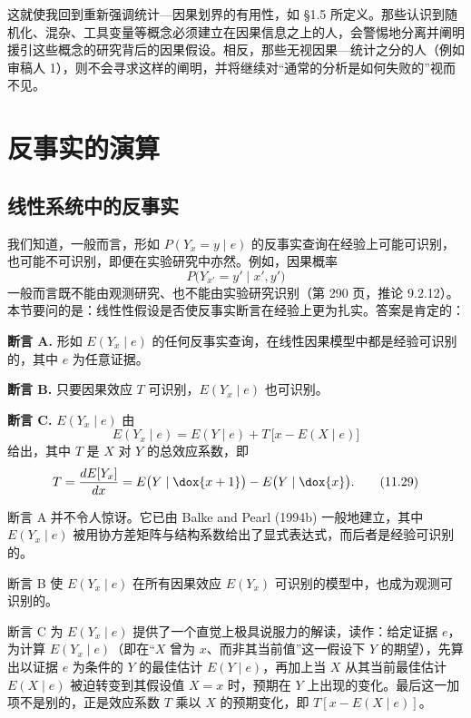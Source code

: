 这就使我回到重新强调统计—因果划界的有用性，如 \S1.5 所定义。那些认识到随机化、混杂、工具变量等概念必须建立在因果信息之上的人，会警惕地分离并阐明援引这些概念的研究背后的因果假设。相反，那些无视因果—统计之分的人（例如审稿人 1），则不会寻求这样的阐明，并将继续对“通常的分析是如何失败的”视而不见。

\section{反事实的演算}

\subsection{线性系统中的反事实}

我们知道，一般而言，形如 $P(Y_x=y\mid e)$ 的反事实查询在经验上可能可识别，也可能不可识别，即便在实验研究中亦然。例如，因果概率
\[
P\bigl(Y_{x'}=y'\mid x',y'\bigr)
\]
一般而言既不能由观测研究、也不能由实验研究识别（第 290 页，推论 9.2.12）。本节要问的是：线性性假设是否使反事实断言在经验上更为扎实。答案是肯定的：

\noindent\textbf{断言 A.} 形如 $E(Y_x\mid e)$ 的任何反事实查询，在线性因果模型中都是经验可识别的，其中 $e$ 为任意证据。

\noindent\textbf{断言 B.} 只要因果效应 $T$ 可识别，$E(Y_x\mid e)$ 也可识别。

\noindent\textbf{断言 C.} $E(Y_x\mid e)$ 由
\begin{equation}
E(Y_x\mid e)=E(Y\mid e)+T\,\bigl[x-E(X\mid e)\bigr] \tag{11.28}
\end{equation}
给出，其中 $T$ 是 $X$ 对 $Y$ 的总效应系数，即
\begin{equation}
T=\frac{dE[Y_x]}{dx}=E\bigl(Y\mid\dox{x+1}\bigr)-E\bigl(Y\mid\dox{x}\bigr). \tag{11.29}
\end{equation}

断言 A 并不令人惊讶。它已由 Balke and Pearl (1994b) 一般地建立，其中 $E(Y_x\mid e)$ 被用协方差矩阵与结构系数给出了显式表达式，而后者是经验可识别的。

断言 B 使 $E(Y_x\mid e)$ 在所有因果效应 $E(Y_x)$ 可识别的模型中，也成为观测可识别的。

断言 C 为 $E(Y_x\mid e)$ 提供了一个直觉上极具说服力的解读，读作：给定证据 $e$，为计算 $E(Y_x\mid e)$（即在“$X$ 曾为 $x$、而非其当前值”这一假设下 $Y$ 的期望），先算出以证据 $e$ 为条件的 $Y$ 的最佳估计 $E(Y\mid e)$，再加上当 $X$ 从其当前最佳估计 $E(X\mid e)$ 被迫转变到其假设值 $X=x$ 时，预期在 $Y$ 上出现的变化。最后这一加项不是别的，正是效应系数 $T$ 乘以 $X$ 的预期变化，即 $T[x-E(X\mid e)]$。

